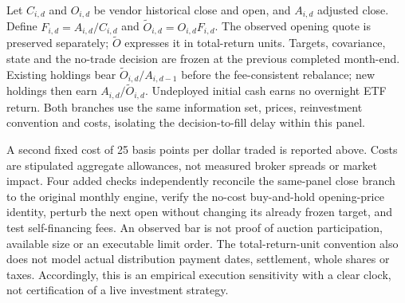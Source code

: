 Let $C_{i,d}$ and $O_{i,d}$ be vendor historical close and open, and $A_{i,d}$ adjusted close. Define $F_{i,d}=A_{i,d}/C_{i,d}$ and $\widetilde O_{i,d}=O_{i,d}F_{i,d}$. The observed opening quote is preserved separately; $\widetilde O$ expresses it in total-return units. Targets, covariance, state and the no-trade decision are frozen at the previous completed month-end. Existing holdings bear $\widetilde O_{i,d}/A_{i,d-1}$ before the fee-consistent rebalance; new holdings then earn $A_{i,d}/\widetilde O_{i,d}$. Undeployed initial cash earns no overnight ETF return. Both branches use the same information set, prices, reinvestment convention and costs, isolating the decision-to-fill delay within this panel.



A second fixed cost of 25 basis points per dollar traded is reported above. Costs are stipulated aggregate allowances, not measured broker spreads or market impact. Four added checks independently reconcile the same-panel close branch to the original monthly engine, verify the no-cost buy-and-hold opening-price identity, perturb the next open without changing its already frozen target, and test self-financing fees. An observed bar is not proof of auction participation, available size or an executable limit order. The total-return-unit convention also does not model actual distribution payment dates, settlement, whole shares or taxes. Accordingly, this is an empirical execution sensitivity with a clear clock, not certification of a live investment strategy.
